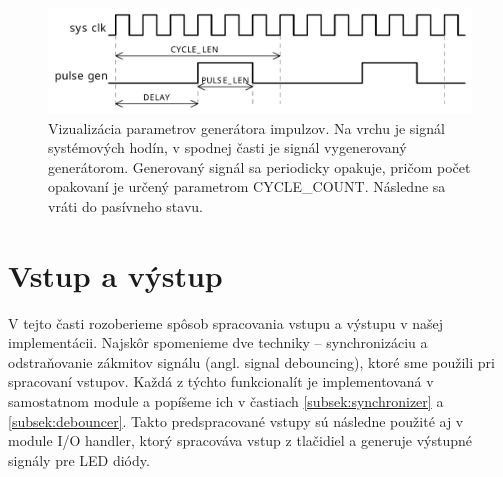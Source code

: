 \begin{figure}
    \centerline{\includegraphics[width=1\textwidth]{images/signals/pulseGen.pdf}}
    \caption[Vizualizácia parametrov generátora impulzov]{Vizualizácia parametrov generátora impulzov. Na vrchu je signál systémových hodín, v spodnej časti je signál vygenerovaný generátorom. Generovaný signál sa periodicky opakuje, pričom počet opakovaní je určený parametrom CYCLE\_COUNT. Následne sa vráti do pasívneho stavu.}
    \label{obr:pulseGen}
\end{figure}

\section{Vstup a výstup} \label{sek:io}
V tejto časti rozoberieme spôsob spracovania vstupu a výstupu v našej implementácii. Najskôr spomenieme dve techniky -- synchronizáciu a odstraňovanie zákmitov signálu (angl. signal debouncing), ktoré sme použili pri spracovaní vstupov. Každá z týchto funkcionalít je implementovaná v samostatnom module a popíšeme ich v častiach \ref{subsek:synchronizer} a \ref{subsek:debouncer}. Takto predspracované vstupy sú následne použité aj v module I/O handler, ktorý spracováva vstup z tlačidiel a generuje výstupné signály pre LED diódy.

